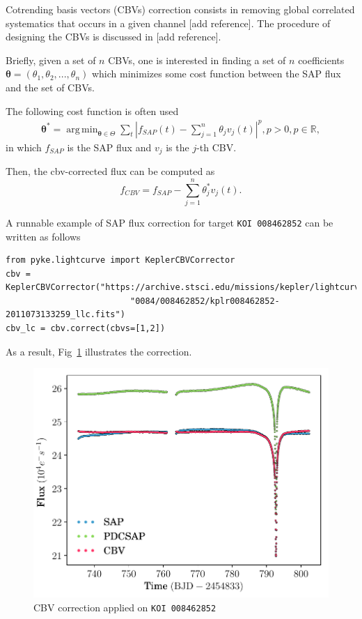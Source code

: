 \documentclass{article}
\DeclareMathOperator*{\argmin}{arg\,min}
\begin{document}
Cotrending basis vectors (CBVs) correction consists in removing global correlated
systematics that occurs in a given channel [add reference]. The procedure of
designing the CBVs is discussed in [add reference].

Briefly, given a set of $n$ CBVs, one is interested in finding a set of $n$
coefficients $\bm{\theta}=(\theta_1, \theta_2, ..., \theta_n)$ which minimizes
some cost function between the SAP flux and the set of CBVs.

The following cost function is often used
\begin{align}
    \bm{\theta}^{*} = \argmin_{\bm{\theta} \in \Theta} \sum_{t}|f_{SAP}(t)
    - \sum_{j=1}^{n}\theta_j v_{j}(t)|^p, p>0, p \in \mathbb{R},
\end{align}
in which $f_{SAP}$ is the SAP flux and $v_j$ is the $j$-th CBV.

Then, the cbv-corrected flux can be computed as
\begin{equation}
    f_{CBV} = f_{SAP} - \sum_{j=1}^{n}\theta^{*}_j v_{j}(t).
\end{equation}

A runnable example of SAP flux correction for target \texttt{KOI 008462852}
can be written as follows
\begin{verbatim}
from pyke.lightcurve import KeplerCBVCorrector
cbv = KeplerCBVCorrector("https://archive.stsci.edu/missions/kepler/lightcurves/"
                         "0084/008462852/kplr008462852-2011073133259_llc.fits")
cbv_lc = cbv.correct(cbvs=[1,2])
\end{verbatim}

As a result, Fig~\ref{fig:cbv-correction} illustrates the correction.
\begin{figure}[!htb]
    \centering
    \includegraphics[scale=.5]{figs/cbv.pdf}
    \caption{CBV correction applied on \texttt{KOI 008462852}}
    \label{fig:cbv-correction}
\end{figure}
\end{document}
